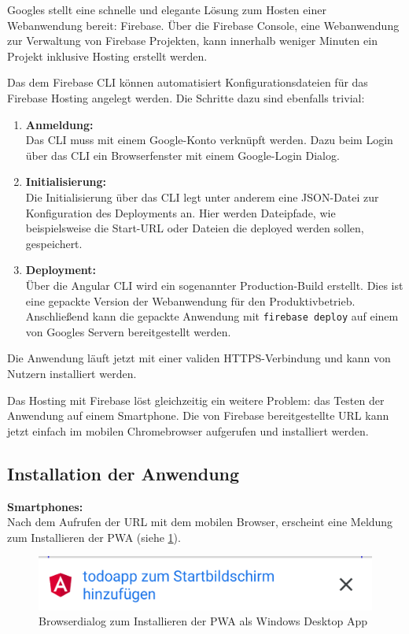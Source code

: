 Googles stellt eine schnelle und elegante Lösung zum Hosten einer Webanwendung bereit: Firebase. Über die Firebase Console, eine Webanwendung zur Verwaltung von Firebase Projekten, kann innerhalb weniger Minuten ein Projekt inklusive Hosting erstellt werden.

Das dem Firebase CLI können automatisiert Konfigurationsdateien für das Firebase Hosting angelegt werden. Die Schritte dazu sind ebenfalls trivial:
\begin{enumerate}
	\item \textbf{Anmeldung: \\}
	      Das CLI muss mit einem Google-Konto verknüpft werden. Dazu beim Login über das CLI ein Browserfenster mit einem Google-Login Dialog.
	\item \textbf{Initialisierung: \\}
	      Die Initialisierung über das CLI legt unter anderem eine JSON-Datei zur Konfiguration des Deployments an. Hier werden Dateipfade, wie beispielsweise die Start-URL oder Dateien die deployed werden sollen, gespeichert.
	\item \textbf{Deployment: \\}
	      Über die Angular CLI wird ein sogenannter Production-Build erstellt. Dies ist eine gepackte Version der Webanwendung für den Produktivbetrieb.
	      Anschließend kann die gepackte Anwendung mit \texttt{firebase deploy} auf einem von Googles Servern bereitgestellt werden.
\end{enumerate}

Die Anwendung läuft jetzt mit einer validen HTTPS-Verbindung und kann von Nutzern installiert werden.

Das Hosting mit Firebase löst gleichzeitig ein weitere Problem: das Testen der Anwendung auf einem Smartphone. Die von Firebase bereitgestellte URL kann jetzt einfach im mobilen Chromebrowser aufgerufen und installiert werden.

\subsection{Installation der Anwendung}
\textbf{Smartphones:}\\
Nach dem Aufrufen der URL mit dem mobilen Browser, erscheint eine Meldung zum Installieren der PWA (siehe \ref{fig:dialog_install_pwa_mobile}).

\begin{figure}[h]
	\includegraphics[scale=0.5]{img/pwa_add_to_homescreen.png}
	\centering
	\caption{Browserdialog zum Installieren der PWA als Windows Desktop App}
	\label{fig:dialog_install_pwa_mobile}
\end{figure}


